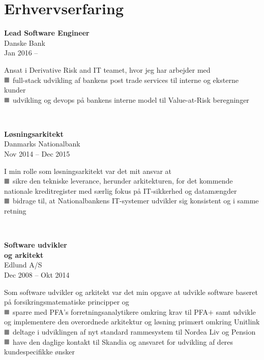 \documentclass[10pt, a4paper]{article}
\newcommand*{\greysquare}{\textcolor{gray}{\blacksquare}}
\begin{document}
\section{Erhvervserfaring}
\begin{Row}%
  \begin{Cell}{1}
    \textbf{Lead Software Engineer} \\ [1ex]
    Danske Bank \\
    Jan 2016 -- %
  \end{Cell}
  \begin{Cell}{3}
    Ansat i Derivative Risk and IT teamet, hvor jeg har arbejder med \\ [1ex]
    $\greysquare$ full-stack udvikling af bankens post trade services til interne og eksterne kunder \\
    $\greysquare$ udvikling og devops på bankens interne model til Value-at-Risk beregninger \\
  \end{Cell}
\end{Row}
\\[0.5cm]\begin{Row}%
  \begin{Cell}{1}
    \textbf{Løsningsarkitekt} \\ [1ex]
    Danmarks Nationalbank \\
    Nov 2014 -- Dec 2015 %
  \end{Cell}
  \begin{Cell}{3}
    I min rolle som løsningsarkitekt var det mit ansvar at \\ [1ex]
    $\greysquare$ sikre den tekniske leverance, herunder arkitekturen, for det kommende nationale kreditregister med særlig fokus på IT-sikkerhed og datamængder \\
    $\greysquare$ bidrage til, at Nationalbankens IT-systemer udvikler sig konsistent og i samme retning
  \end{Cell}
\end{Row}
\\[0.5cm]
\begin{Row}
  \begin{Cell}{1}
    \textbf{Software udvikler \\
    og arkitekt} \\ [1ex]
    Edlund A/S \\
    Dec 2008 -- Okt 2014 %
  \end{Cell}
  \begin{Cell}{3}
    Som software udvikler og arkitekt var det min opgave at udvikle software baseret på forsikringsmatematiske principper og \\ [1ex]
    $\greysquare$ sparre med PFA's forretningsanalytikere omkring krav til PFA$+$ samt udvikle og
    implementere den overordnede arkitektur og løsning primært omkring Unitlink \\
    $\greysquare$ deltage i udviklingen af nyt standard rammesystem til Nordea Liv og Pension \\
    $\greysquare$ have den daglige kontakt til Skandia og ansvaret for udvikling af deres kundespecifikke ønsker
  \end{Cell}
\end{Row}
\end{document}
